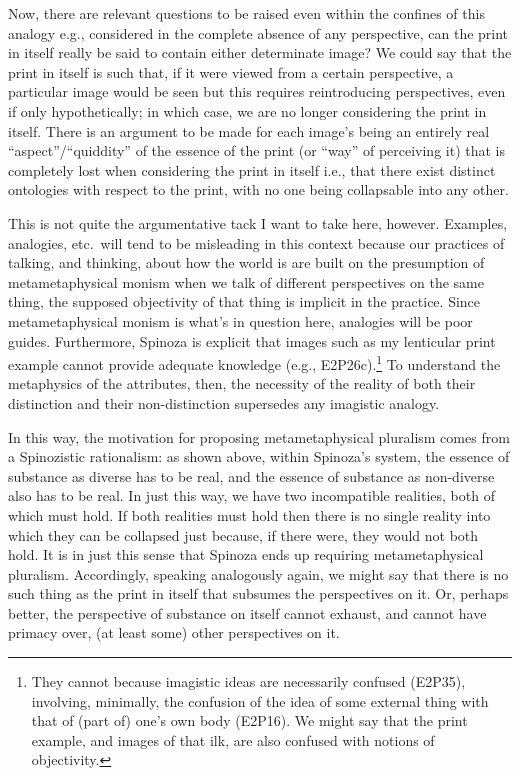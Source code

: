 \documentclass[11pt]{article}
\newcommand{\dash}{\unskip{---}}
\newcommand\simplecite[1]{(#1)}
\begin{document}
	Now, there are relevant questions to be raised even within the confines of this analogy \dash e.g., considered in the complete absence of any perspective, can the print in itself really be said to contain either determinate image? We could say that the print in itself is such that, if it were viewed from a certain perspective, a particular image would be seen \dash but this requires reintroducing perspectives, even if only hypothetically; in which case, we are no longer considering the print in itself. There is an argument to be made for each image's being an entirely real \enquote{aspect}/\enquote{quiddity} of the essence of the print (or \enquote{way} of perceiving it) that is completely lost when considering the print in itself \dash i.e., that there exist distinct ontologies with respect to the print, with no one being collapsable into any other.
	
	This is not quite the argumentative tack I want to take here, however. Examples, analogies, etc.\ will tend to be misleading in this context because our practices of talking, and thinking, about how the world is are built on the presumption of metametaphysical monism \dash when we talk of different perspectives on the same thing, the supposed objectivity of that thing is implicit in the practice. Since metametaphysical monism is what's in question here, analogies will be poor guides. Furthermore, Spinoza is explicit that images \dash such as my lenticular print example \dash cannot provide adequate knowledge \simplecite{e.g., E2P26c}.\footnote{They cannot because imagistic ideas are necessarily confused \simplecite{E2P35}, involving, minimally, the confusion of the idea of some external thing with that of (part of) one's own body \simplecite{E2P16}. We might say that the print example, and images of that ilk, are also confused with notions of objectivity.} To understand the metaphysics of the attributes, then, the necessity of the reality of both their distinction and their non-distinction supersedes any imagistic analogy.
	
	In this way, the motivation for proposing metametaphysical pluralism comes from a Spinozistic rationalism: as shown above, within Spinoza's system, the essence of substance as diverse has to be real, and the essence of substance as non-diverse also has to be real. In just this way, we have two incompatible realities, both of which must hold. If both realities must hold then there is no single reality into which they can be collapsed \dash just because, if there were, they would not both hold. It is in just this sense that Spinoza ends up requiring metametaphysical pluralism. Accordingly, speaking analogously again, we might say that there is no such thing as the print in itself that subsumes the perspectives on it. Or, perhaps better, the perspective of substance on itself cannot exhaust, and cannot have primacy over, (at least some) other perspectives on it.
	
\end{document}
